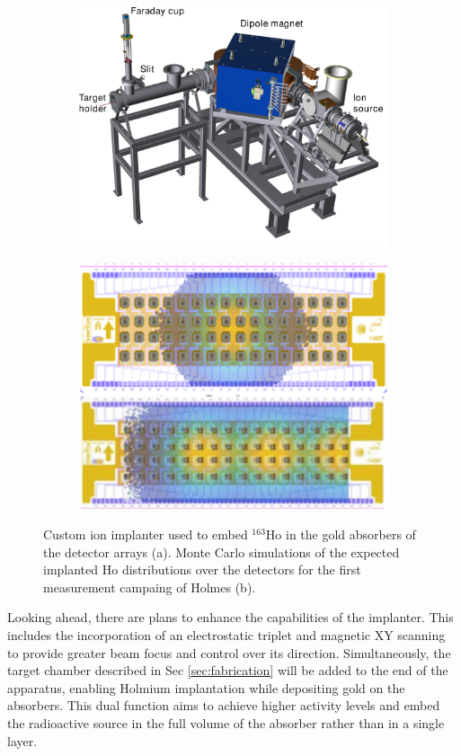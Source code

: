 \begin{figure}[t]
    \begin{subfigure}[b]{0.44\linewidth}
\includegraphics[width=\linewidth]{figures/ch1/implanter.pdf}
\caption{}
\end{subfigure}
\hfill
\begin{subfigure}[b]{0.4\linewidth}
    \includegraphics[width=\linewidth]{figures/ch1/implantationMC.png}
\caption{}
\end{subfigure}
\caption{Custom ion implanter used to embed $^{163}$Ho in the gold absorbers of the detector arrays (a). Monte Carlo
simulations of the expected implanted Ho distributions over the detectors for the first measurement campaing of Holmes
(b).}  
\label{fig:implanter}
\end{figure}
Looking ahead, there are plans to enhance the capabilities of the implanter. This includes the incorporation of an
electrostatic triplet and magnetic XY scanning to provide greater beam focus and control over its direction.
Simultaneously, the target chamber described in Sec \ref{sec:fabrication} will be added to the end of the apparatus, enabling Holmium implantation while
depositing gold on the absorbers. This dual function aims to achieve higher activity levels and embed the radioactive source in the full volume of the absorber rather than in a single layer.

